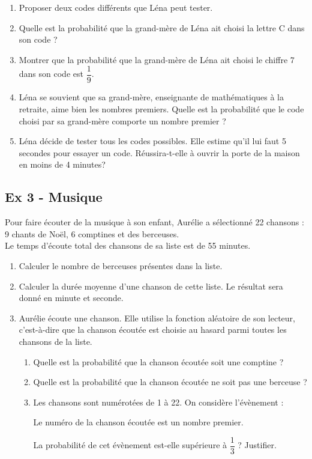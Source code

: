 \begin{enumerate}
  \item Proposer deux codes différents que Léna peut tester.
  \item Quelle est la probabilité que la grand-mère de Léna ait choisi la lettre C dans son code ?
  \item Montrer que la probabilité que la grand-mère de Léna ait choisi le chiffre 7 dans son code est $\dfrac{1}{9}$.
  \item Léna se souvient que sa grand-mère, enseignante de mathématiques à la retraite, aime bien les nombres premiers. Quelle est la probabilité que le code choisi par sa grand-mère comporte un nombre premier ?
  \item Léna décide de tester tous les codes possibles. Elle estime qu'il lui faut 5 secondes pour essayer un code. Réussira-t-elle à ouvrir la porte de la maison en moins de 4 minutes?
\end{enumerate}

\subsection*{Ex 3 - Musique}

Pour faire écouter de la musique à son enfant, Aurélie a sélectionné 22 chansons : \\
9 chants de Noël, 6 comptines et des berceuses.\\
Le temps d'écoute total des chansons de sa liste est de 55 minutes.

\begin{enumerate}
  \item Calculer le nombre de berceuses présentes dans la liste.
  \item Calculer la durée moyenne d'une chanson de cette liste. Le résultat sera donné en
  minute et seconde.
  \item Aurélie écoute une chanson. Elle utilise la fonction aléatoire de son lecteur, c'est-à-dire que la chanson écoutée est choisie au hasard parmi toutes les chansons de la liste.
	\begin{enumerate}
		\item Quelle est la probabilité que la chanson écoutée soit une comptine ?
		\item Quelle est la probabilité que la chanson écoutée ne soit pas une berceuse ?
		\item Les chansons sont numérotées de 1 à 22. On considère l'évènement :
		
    \begin{center}\og Le numéro de la chanson écoutée est un nombre premier. \fg\end{center}
    La probabilité de cet évènement est-elle supérieure à $\dfrac{1}{3}$ ? Justifier.
  \end{enumerate}
\end{enumerate}

